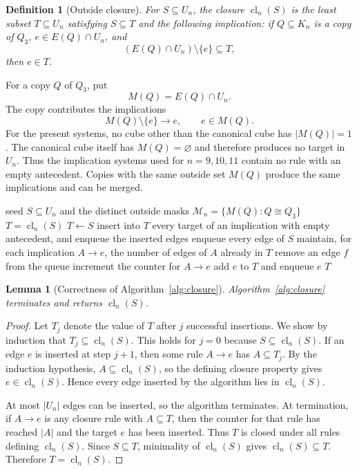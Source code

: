 \documentclass[11pt]{article}
\numberwithin{equation}{section}
\newtheorem{lemma}[theorem]{Lemma}
\newtheorem{definition}[theorem]{Definition}
\newcommand{\cl}{\operatorname{cl}}
\begin{document}
\begin{definition}[Outside closure]\label{def:closure}
For $S\subseteq U_n$, the closure $\cl_n(S)$ is the least subset $T\subseteq U_n$ satisfying $S\subseteq T$ and the following implication: if $Q\subseteq K_n$ is a copy of $Q_3$, $e\in E(Q)\cap U_n$, and
\[
(E(Q)\cap U_n)\setminus\{e\}\subseteq T,
\]
then $e\in T$.
\end{definition}

For a copy $Q$ of $Q_3$, put
\[
M(Q)=E(Q)\cap U_n.
\]
The copy contributes the implications
\[
M(Q)\setminus\{e\}\longrightarrow e,
\qquad e\in M(Q).
\tag{3.2}
\]
For the present systems, no cube other than the canonical cube has
$|M(Q)|=1$. The canonical cube itself has $M(Q)=\varnothing$ and therefore
produces no target in $U_n$. Thus the implication systems used for
$n=9,10,11$ contain no rule with an empty antecedent. Copies with the same
outside set $M(Q)$ produce the same implications and can be merged.

\begin{algorithm}[t]
\caption{Exact closure computation}
\label{alg:closure}
\begin{algorithmic}[1]
\Require seed $S\subseteq U_n$ and the distinct outside masks $\mathcal M_n=\{M(Q):Q\cong Q_3\}$
\Ensure $T=\cl_n(S)$
\State $T\gets S$
\State insert into $T$ every target of an implication with empty antecedent, and enqueue the inserted edges
\State enqueue every edge of $S$
\State maintain, for each implication $A\to e$, the number of edges of $A$ already in $T$
    \State remove an edge $f$ from the queue
        \State increment the counter for $A\to e$
            \State add $e$ to $T$ and enqueue $e$
        \EndIf
    \EndFor
\EndWhile
\State \Return $T$
\end{algorithmic}
\end{algorithm}

\begin{lemma}[Correctness of Algorithm~\ref{alg:closure}]\label{lem:closure}
Algorithm~\ref{alg:closure} terminates and returns $\cl_n(S)$.
\end{lemma}

\begin{proof}
Let $T_j$ denote the value of $T$ after $j$ successful insertions. We show by
induction that $T_j\subseteq\cl_n(S)$. This holds for $j=0$ because
$S\subseteq\cl_n(S)$. If an edge $e$ is inserted at step $j+1$, then some
rule $A\to e$ has $A\subseteq T_j$. By the induction hypothesis,
$A\subseteq\cl_n(S)$, so the defining closure property gives
$e\in\cl_n(S)$. Hence every edge inserted by the algorithm lies in
$\cl_n(S)$.

At most $|U_n|$ edges can be inserted, so the algorithm terminates. At
termination, if $A\to e$ is any closure rule with $A\subseteq T$, then the
counter for that rule has reached $|A|$ and the target $e$ has been inserted.
Thus $T$ is closed under all rules defining $\cl_n(S)$. Since $S\subseteq T$,
minimality of $\cl_n(S)$ gives $\cl_n(S)\subseteq T$. Therefore
$T=\cl_n(S)$.
\end{proof}
\end{document}
